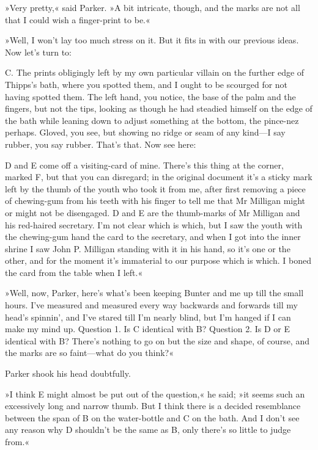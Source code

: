 »Very pretty,« said Parker. »A bit intricate, though, and the marks are not all that I could wish a finger-print to be.«

»Well, I won't lay too much stress on it. But it fits in with our previous ideas. Now let's turn to:

\textsc{C.} The prints obligingly left by my own particular villain on the further edge of Thipps's bath, where you spotted them, and I ought to be scourged for not having spotted them. The left hand, you notice, the base of the palm and the fingers, but not the tips, looking as though he had steadied himself on the edge of the bath while leaning down to adjust something at the bottom, the pince-nez perhaps. Gloved, you see, but showing no ridge or seam of any kind—I say rubber, you say rubber. That's that. Now see here:

\textsc{D} and \textsc{E} come off a visiting-card of mine. There's this thing at the corner, marked F, but that you can disregard; in the original document it's a sticky mark left by the thumb of the youth who took it from me, after first removing a piece of chewing-gum from his teeth with his finger to tell me that Mr Milligan might or might not be disengaged. D and E are the thumb-marks of Mr Milligan and his red-haired secretary. I'm not clear which is which, but I saw the youth with the chewing-gum hand the card to the secretary, and when I got into the inner shrine I saw John P. Milligan standing with it in his hand, so it's one or the other, and for the moment it's immaterial to our purpose which is which. I boned the card from the table when I left.«

»Well, now, Parker, here's what's been keeping Bunter and me up till the small hours. I've measured and measured every way backwards and forwards till my head's spinnin', and I've stared till I'm nearly blind, but I'm hanged if I can make my mind up. Question 1. Is \textsc{C} identical with \textsc{B}? Question 2. Is \textsc{D} or \textsc{E} identical with \textsc{B}? There's nothing to go on but the size and shape, of course, and the marks are so faint—what do you think?«

Parker shook his head doubtfully.

»I think \textsc{E} might almost be put out of the question,« he said; »it seems such an excessively long and narrow thumb. But I think there is a decided resemblance between the span of \textsc{B} on the water-bottle and \textsc{C} on the bath. And I don't see any reason why \textsc{D} shouldn't be the same as \textsc{B}, only there's so little to judge from.«

